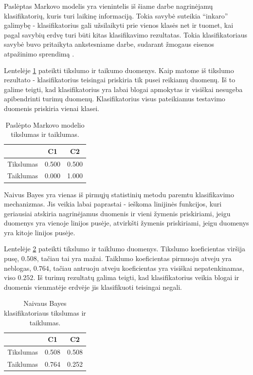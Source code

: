 \documentclass[]{vgtuef}
\begin{document}
Paslėptas Markovo modelis yra vienintelis iš šiame darbe nagrinėjamų klasifikatorių, kuris turi laikinę informaciją. Tokia savybė suteikia ``inkaro'' galimybę - klasifikatorius gali užsilaikyti prie vienos klasės net ir tuomet, kai pagal savybių erdvę turi būti kitas klasifikavimo rezultatas. Tokia klasifikatoriaus savybė buvo pritaikyta ankstesniame darbe, sudarant žmogaus eisenos atpažinimo sprendimą \cite{mano_darbas}.

Lentelėje \ref{table:hmm_scores} pateikti tikslumo ir taikumo duomenys. Kaip matome iš tikslumo rezultato - klasifikatorius teisingai priskiria tik pusei reikiamų duomenų. Iš to galime teigti, kad klasifikatorius yra labai blogai apmokytas ir visiškai nesugeba apibendrinti turimų duomenų. Klasifikatorius visus pateikiamus testavimo duomenis priskiria vienai klasei.

\begin{table}[!t]
  \renewcommand{\arraystretch}{1.3}
  \centering
  \caption{Paslėpto Markovo modelio tikslumas ir taiklumas.}
  \label{table:hmm_scores}
  \begin{tabular}{|c|c|c|} \hline
    & C1 & C2 \\ \hline
    Tikslumas & 0.500 & 0.500 \\ \hline
    Taiklumas & 0.000 & 1.000 \\ \hline
  \end{tabular}
\end{table}

Naivus Bayes yra vienas iš pirmųjų statistinių metodu paremtu klasifikavimo mechanizmas. Jis veikia labai paprastai - ieškoma linijinės funkcijos, kuri geriausiai atskiria nagrinėjamus duomenis ir vieni žymenis priskiriami, jeigu duomenys yra vienoje linijos pusėje, atvirkšti žymenis priskiriami, jeigu duomenys yra kitoje linijos pusėje. 

Lentelėje \ref{table:nb_scores} pateikti tikslumo ir taiklumo duomenys. Tikslumo koeficientas viršija pusę, $0.508$, tačiau tai yra mažai. Taiklumo koeficientas pirmuoju atveju yra neblogas, $0.764$, tačiau antruoju atveju koeficientas yra visiškai nepatenkinamas, viso $0.252$. Iš turimų rezultatų galima teigti, kad klasifikatorius veikia blogai ir duomenis vienmatėje erdvėje jis klasifikuoti teisingai negali.

\begin{table}[!t]
  \centering
  \caption{Naivaus Bayes klasifikatoriaus tikslumas ir taiklumas.}
  \label{table:nb_scores}
  \begin{tabular}{|c|c|c|} \hline
    & C1 & C2 \\ \hline
    Tikslumas & 0.508 & 0.508 \\ \hline
    Taiklumas & 0.764 & 0.252 \\ \hline
  \end{tabular}
\end{table}
\end{document}
